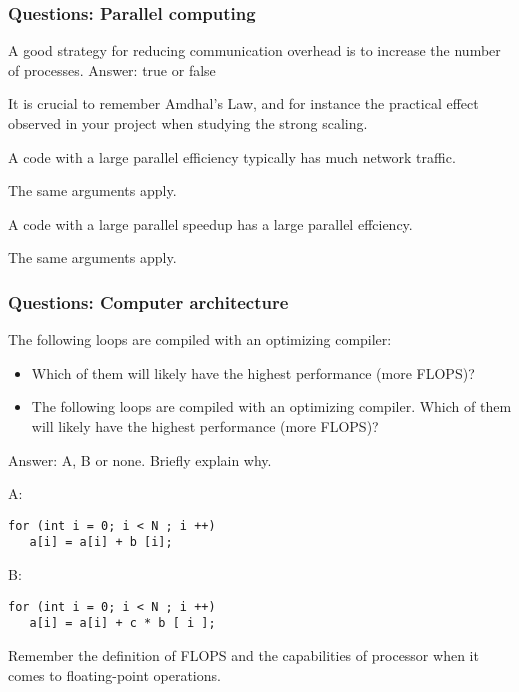 \begin{frame}[fragile]
  \frametitle{Questions: Parallel computing}

\begin{ex}[2016]
A good strategy for reducing communication overhead is to increase the
number of processes. Answer: true or false
\end{ex}

It is crucial to remember Amdhal's Law, and for instance the practical effect observed in your project when studying the strong scaling.

\begin{ex}[2015]
A code with a large parallel efficiency typically has much network traffic.
\end{ex}

The same arguments apply.

\begin{ex}[2015]
A code with a large parallel speedup has a large parallel effciency.
\end{ex}

The same arguments apply.

\end{frame}

\begin{frame}[fragile]
  \frametitle{Questions: Computer architecture}

\begin{ex}[2016]
The following loops are compiled with an optimizing compiler:
\begin{itemize}
\item  Which of them will likely have the highest performance (more FLOPS)?
\item The following loops are compiled with an optimizing compiler. Which of
them will likely have the highest performance (more FLOPS)? 
\end{itemize}
Answer: A, B or none. Briefly explain why.
\end{ex}

A:
\begin{lstlisting}[style=c]
for (int i = 0; i < N ; i ++)
   a[i] = a[i] + b [i];
\end{lstlisting}
B:
\begin{lstlisting}[style=c]
for (int i = 0; i < N ; i ++)
   a[i] = a[i] + c * b [ i ];
\end{lstlisting}

Remember the definition of FLOPS and the capabilities of processor when it comes to floating-point operations.
\end{frame}

